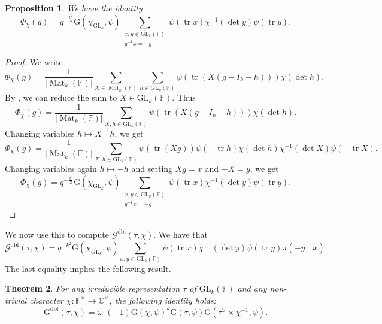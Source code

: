 \documentclass[12pt, reqno]{amsart}
\newtheorem{theorem}{Theorem}[section]
\newtheorem{proposition}[theorem]{Proposition}
\theoremstyle{definition}
\theoremstyle{definition}
\theoremstyle{definition}
\newcommand{\cComplex}{\mathbb{C}}
\newcommand{\multiplicativegroup}[1]{#1^{\times}}
\newcommand{\sizeof}[1]{\left|#1\right|}
\newcommand{\fieldCharacter}{\psi}
\newcommand{\centralCharacter}[1]{\omega_{#1}}
\newcommand{\IdentityMatrix}[1]{I_{#1}}
\newcommand{\trace}{\operatorname{tr}}
\newcommand{\GL}{\mathrm{GL}}
\newcommand{\finiteField}{\mathbb{F}}
\newcommand{\squareMatrix}{\operatorname{Mat}}
\newcommand{\dblGaussSum}[2]{\mathcal{G}^{\mathrm{dbl}}\left(#1, #2\right)}
\newcommand{\GaussSumScalar}[2]{\mathrm{G}\left(#1, #2\right)}
\newcommand{\dblGaussSumScalar}[2]{\mathrm{G}^{\mathrm{dbl}}\left(#1, #2\right)}
\begin{document}
\begin{proposition}\label{prop:doubling-for-gln-in-terms-of-kondo}
	We have the identity
	$$\Phi_{\chi}\left(g\right) = q^{-\frac{k^2}{2}} \GaussSumScalar{\chi_{\GL_k}}{\fieldCharacter} \sum_{\substack{x, y \in \GL_k\left(\finiteField\right)\\
			y^{-1} x = -g}} \fieldCharacter\left(\trace x\right) \chi^{-1}\left(\det y\right) \fieldCharacter\left(\trace y\right).$$
\end{proposition}
\begin{proof}
	We write $$\Phi_{\chi}\left(g\right) = \frac{1}{\sizeof{\squareMatrix_k\left(\finiteField\right)}}\sum_{X \in \squareMatrix_k\left(\finiteField\right)} \sum_{h \in \GL_k\left(\finiteField\right)} \fieldCharacter\left(\trace \left(X\left(g-\IdentityMatrix{k}-h\right)\right)\right) \chi\left(\det h\right).$$
	By , we can reduce the sum to $X \in \GL_k\left(\finiteField\right)$. Thus	$$\Phi_{\chi}\left(g\right) = \frac{1}{\sizeof{\squareMatrix_k\left(\finiteField\right)}} \sum_{X, h \in \GL_k\left(\finiteField\right)} \fieldCharacter\left(\trace \left(X\left(g-\IdentityMatrix{k}-h\right)\right)\right) \chi\left(\det h\right).$$
	Changing variables $h \mapsto X^{-1} h$, we get
	$$\Phi_{\chi}\left(g\right) = \frac{1}{\sizeof{\squareMatrix_k\left(\finiteField\right)}} \sum_{X, h \in \GL_k\left(\finiteField\right)} \fieldCharacter\left(\trace \left(Xg\right)\right) \fieldCharacter\left(-\trace h\right) \chi\left(\det h\right) \chi^{-1}\left(\det X\right) \fieldCharacter\left(-\trace X\right).$$
	Changing variables again $h \mapsto -h$ and setting $Xg = x$ and $-X = y$, we get  
	$$\Phi_{\chi}\left(g\right) = q^{-\frac{k^2}{2}} \GaussSumScalar{\chi_{\GL_k}}{\fieldCharacter} \sum_{\substack{x, y \in \GL_k\left(\finiteField\right)\\
			y^{-1} x = -g}} \fieldCharacter\left(\trace x\right) \chi^{-1}\left(\det y\right) \fieldCharacter\left(\trace y\right).$$
\end{proof}

We now use this to compute $\dblGaussSum{\tau}{\chi}$. We have that $$\dblGaussSum{\tau}{\chi} = q^{-k^2} \GaussSumScalar{\chi_{\GL_k}}{\fieldCharacter} \sum_{x, y \in \GL_k\left(\finiteField\right)} \fieldCharacter\left(\trace x\right) \chi^{-1}\left(\det y\right) \fieldCharacter\left(\trace y\right) \pi\left(-y^{-1} x\right).$$
The last equality implies the following result.
\begin{theorem}\label{thm:gln-doubling-gauss-sum-in-terms-of-kondo}For any irreducible representation $\tau$ of $\GL_k\left(\finiteField\right)$ and any non-trivial character $\chi \colon \multiplicativegroup{\finiteField} \to \multiplicativegroup{\cComplex}$, the following identity holds:
	$$\dblGaussSumScalar{\tau}{\chi} = \centralCharacter{\tau}\left(-1\right) \GaussSumScalar{\chi}{\fieldCharacter}^k \GaussSumScalar{\tau}{\fieldCharacter} \GaussSumScalar{\tau^{\vee} \times \chi^{-1}}{\fieldCharacter}.$$
\end{theorem}
\end{document}
